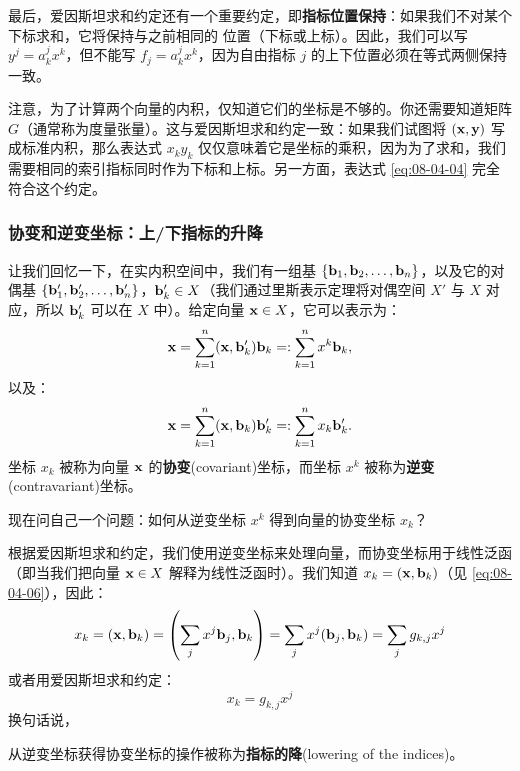 最后，爱因斯坦求和约定还有一个重要约定，即\textbf{指标位置保持}：如果我们不对某个下标求和，它将保持与之前相同的 位置（下标或上标）。因此，我们可以写 $y^j = a^j_k x^k$，但不能写 $f_j = a^j_k x^k$，因为自由指标 $j$ 的上下位置必须在等式两侧保持一致。

注意，为了计算两个向量的内积，仅知道它们的坐标是不够的。你还需要知道矩阵 $G$（通常称为度量张量）。这与爱因斯坦求和约定一致：如果我们试图将 $(\mathbf{x}, \mathbf{y})$ 写成标准内积，那么表达式 $x_k y_k$ 仅仅意味着它是坐标的乘积，因为为了求和，我们需要相同的索引指标同时作为下标和上标。另一方面，表达式 \eqref{eq:08-04-04} 完全符合这个约定。

\subsubsection{协变和逆变坐标：上/下指标的升降}\label{sec:08-04-03-02}

让我们回忆一下，在实内积空间中，我们有一组基 $\{\mathbf{b}_1, \mathbf{b}_2, \dots, \mathbf{b}_n\}$，以及它的对偶基 $\{\mathbf{b}'_1, \mathbf{b}'_2, \dots, \mathbf{b}'_n\}$，$\mathbf{b}'_k \in X$（我们通过里斯表示定理将对偶空间 $X'$ 与 $X$ 对应，所以 $\mathbf{b}'_k$ 可以在 $X$ 中）。给定向量 $\mathbf{x} \in X$，它可以表示为：
\begin{equation}\label{eq:08-04-05}
\mathbf{x} = \sum_{k=1}^n (\mathbf{x}, \mathbf{b}'_k) \mathbf{b}_k =: \sum_{k=1}^n x^k \mathbf{b}_k,
\end{equation}
以及：
\begin{equation}\label{eq:08-04-06}
\mathbf{x} = \sum_{k=1}^n (\mathbf{x}, \mathbf{b}_k) \mathbf{b}'_k =: \sum_{k=1}^n x_k \mathbf{b}'_k .
\end{equation}
坐标 $x_k$ 被称为向量 $\mathbf{x}$ 的\textbf{协变}(covariant)坐标，而坐标 $x^k$ 被称为\textbf{逆变}(contravariant)坐标。

现在问自己一个问题：如何从逆变坐标 $x^k$ 得到向量的协变坐标 $x_k$？

根据爱因斯坦求和约定，我们使用逆变坐标来处理向量，而协变坐标用于线性泛函（即当我们把向量 $\mathbf{x} \in X$ 解释为线性泛函时）。我们知道 $ x_k = (\mathbf{x}, \mathbf{b}_k)$（见 \eqref{eq:08-04-06}），因此：
$$ x_k = (\mathbf{x}, \mathbf{b}_k) = \left( \sum_j x^j \mathbf{b}_j, \mathbf{b}_k \right) = \sum_j x^j (\mathbf{b}_j, \mathbf{b}_k) = \sum_j g_{k,j} x^j $$
或者用爱因斯坦求和约定：
$$ x_k = g_{k,j} x^j $$
换句话说，


从逆变坐标获得协变坐标的操作被称为\textbf{指标的降}(lowering of the indices)。


